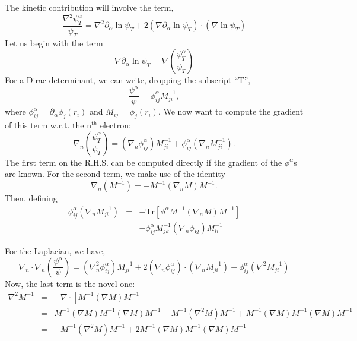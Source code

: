 \documentclass{article}
\begin{document}
The kinetic contribution will involve the term,
\begin{equation}
\frac{\nabla^2 \psi_T^\alpha}{\psi_T} = \nabla^2 \partial_\alpha \ln
\psi_T + 2 (\nabla \partial_\alpha \ln \psi_T)\cdot (\nabla \ln \psi_T)
\end{equation}
Let us begin with the term
\begin{equation}
\nabla \partial_\alpha \ln \psi_T =
\nabla\left(\frac{\psi^\alpha_T}{\psi_T}\right)
\end{equation}
For a Dirac determinant, we can write, dropping the subscript ``T'', 
\begin{equation}
\frac{\psi^\alpha}{\psi} = \phi^\alpha_{ij} M^{-1}_{ji},
\end{equation}
where $\phi^{\alpha}_{ij} = \partial_\alpha \phi_j(r_i)$ and $M_{ij} =
\phi_j(r_i)$.  We now want to compute the gradient of this term
w.r.t. the n$^\text{th}$ electron:
\begin{equation}
\nabla_n \left(\frac{\psi^\alpha_T}{\psi_T}\right)  = 
(\nabla_n \phi_{ij}^\alpha)M^{-1}_{ji} + \phi^\alpha_{ij} (\nabla_n M^{-1}_{ji}).
\end{equation}
The first term on the R.H.S. can be computed directly if the gradient
of the $\phi^\alpha$s are known.  For the second term, we make use of
the identity 
\begin{equation}
\nabla_n (M^{-1}) = -M^{-1} (\nabla_n M) M^{-1}.
\end{equation}
Then, defining 
\begin{eqnarray}
\phi^\alpha_{ij} (\nabla_n M^{-1}_{ji}) & = & -\text{Tr}\left[\phi^\alpha M^{-1}
  (\nabla_n M)M^{-1}\right] \\
& = & -\phi^\alpha_{ij} M^{-1}_{jk} (\nabla_n \phi_{kl}) M^{-1}_{li}
\end{eqnarray}

For the Laplacian, we have,
\begin{equation}
\nabla_n\cdot\nabla_n\left(\frac{\psi^\alpha}{\psi}\right) =
(\nabla_n^2\phi_{ij}^\alpha)M^{-1}_{ji} +
2(\nabla_n\phi_{ij}^\alpha)\cdot(\nabla_n M^{-1}_{ji}) +
\phi^\alpha_{ij}(\nabla^2 M^{-1}_{ji})
\end{equation} 
Now, the last term is the novel one:
\begin{eqnarray}
\nabla^2 M^{-1} & = & -\nabla\cdot [M^{-1}(\nabla M) M^{-1}] \\
& = & M^{-1}(\nabla M)M^{-1}(\nabla M) M^{-1} - M^{-1}(\nabla^2 M)M^{-1}
+ M^{-1}(\nabla M) M^{-1} (\nabla M) M^{-1} \\
& = & -M^{-1} (\nabla^2 M) M^{-1} + 2 M^{-1}(\nabla M) M^{-1}(\nabla M) M^{-1}
\end{eqnarray}
\end{document}
